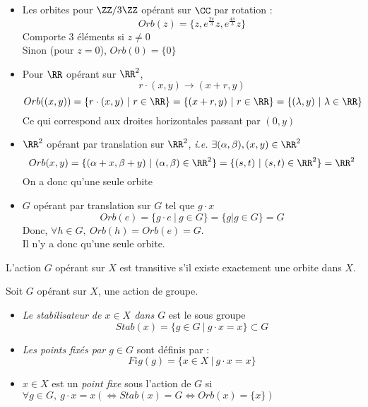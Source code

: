 \documentclass[../main.tex]{subfile}
\begin{document}
\begin{ex}
\begin{itemize}	
	\item Les orbites pour $\ZZ/3\ZZ$ opérant sur $\CC$ par rotation :
	$$Orb(z) = \{z, e^{\frac{2\pi}{3}}z, e^{\frac{4\pi}{3}}z\}$$
	Comporte $3$ éléments si $z \neq 0$\\
	Sinon (pour $z = 0$), $Orb(0) = \{0\}$

	\item Pour $\RR$ opérant sur $\RR^2$,\\
	$$r \cdot (x,y) \to (x + r , y)$$
	$$Orb((x,y)) = \{r \cdot (x,y) \ | \ r \in \RR\} = \{(x + r, y) \ | \ r \in \RR\} = \{(\lambda, y) \ | \ \lambda \in \RR\}$$
	Ce qui correspond aux droites horizontales passant par $(0, y)$
\begin{center}	
	\def\svgwidth{0.3\textwidth}
	
\end{center}

	\item $\RR^2$ opérant par translation sur $\RR^2$, \textit{i.e.} $\exists (\alpha, \beta), (x, y) \in \RR^2$
	$$Orb(x,y) = \{(\alpha + x , \beta + y) \ | \ (\alpha, \beta) \in \RR^2\} = \{(s,t) \ | \ (s,t) \in \RR^2\} = \RR^2$$
	On a donc qu'une seule orbite

	\item $G$ opérant par translation sur $G$ tel que $g \cdot x$
	$$Orb(e) = \{g \cdot e \ | \ g \in G\} = \{ g | g \in G\} = G$$
	Donc, $\forall h \in G, \ Orb(h) = Orb(e) = G$.\\
	Il n'y a donc qu'une seule orbite.
\end{itemize}
\end{ex}

\begin{defi}
	L'action $G$ opérant sur $X$ est transitive s'il existe exactement une orbite dans $X$.
\end{defi}

\begin{defi}	
	Soit $G$ opérant sur $X$, une action de groupe.\\
\begin{itemize}	
	\item \emph{Le stabilisateur de $x \in X$ dans $G$} est le sous groupe
	$$Stab(x) = \{g \in G \ | \ g \cdot x = x\} \subset G$$

	\item \emph{Les points fixés par $g \in G$} sont définis par :
	$$Fig(g) = \{x \in X \ | \ g \cdot x = x\}$$

	\item $x \in X$ est un \emph{point fixe} sous l'action de $G$ si $\forall g \in G, \ g \cdot x = x (\Leftrightarrow Stab(x) = G \Leftrightarrow Orb(x) = \{x\})$
\end{itemize}
\end{defi}
\end{document}
